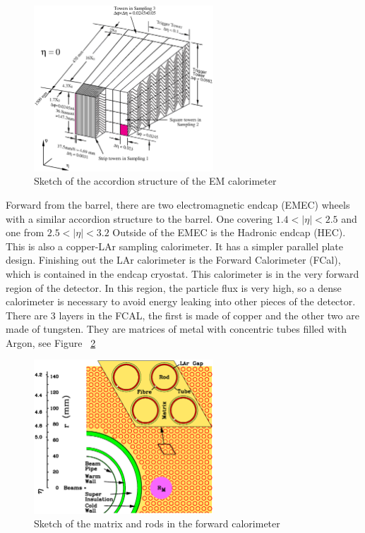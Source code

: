 \begin{figure}[h]
\begin{center}
\includegraphics*[width=0.60\textwidth] {figures/figure1-2}%
\caption[Sketch of the accordion structure of the EM calorimeter]{Sketch of the accordion structure of the EM calorimeter}
\label{fig:LAr_gran}
\end{center}
\end{figure}

\indent Forward from the barrel, there are two electromagnetic endcap (EMEC) wheels with a similar accordion structure to the barrel. One covering ${1.4 < |\eta{}| < 2.5}$ and one from ${2.5 < |\eta{}| < 3.2}$ Outside of the EMEC is the Hadronic endcap (HEC). This is also a copper-LAr sampling calorimeter. It has a simpler parallel plate design. Finishing out the LAr calorimeter is the Forward Calorimeter (FCal), which is contained in the endcap cryostat. This calorimeter is in the very forward region of the detector. In this region, the particle flux is very high, so a dense calorimeter is necessary to avoid energy leaking into other pieces of the detector. There are 3 layers in the FCAL, the first is made of copper and the other two are made of tungsten. They are matrices of metal with concentric tubes filled with Argon, see Figure ~\ref{fig:LAr_forward} \linebreak

\begin{figure}[h]
\begin{center}
\includegraphics*[width=0.60\textwidth] {figures/figure1-9}%
\caption[Sketch of the matrix and rods in the forward calorimeter]{Sketch of the matrix and rods in the forward calorimeter}
\label{fig:LAr_forward}
\end{center}
\end{figure}


